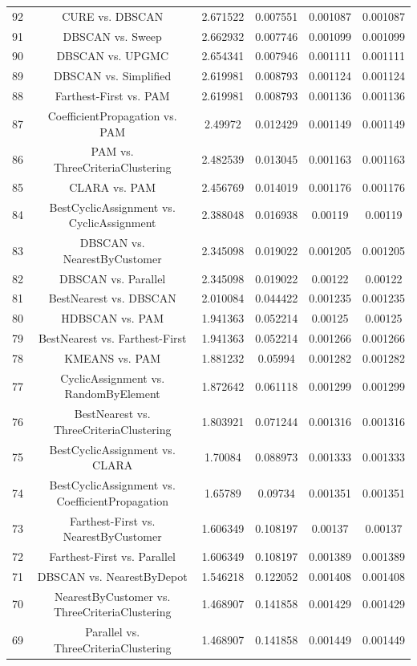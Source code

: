 \documentclass[a4paper,10pt]{article}
\begin{document}
\begin{landscape}
\begin{table}[!htp]
\begin{tabular}{cccccc}
92&CURE vs. DBSCAN&2.671522&0.007551&0.001087&0.001087\\
91&DBSCAN vs. Sweep&2.662932&0.007746&0.001099&0.001099\\
90&DBSCAN vs. UPGMC&2.654341&0.007946&0.001111&0.001111\\
89&DBSCAN vs. Simplified&2.619981&0.008793&0.001124&0.001124\\
88&Farthest-First vs. PAM&2.619981&0.008793&0.001136&0.001136\\
87&CoefficientPropagation vs. PAM&2.49972&0.012429&0.001149&0.001149\\
86&PAM vs. ThreeCriteriaClustering&2.482539&0.013045&0.001163&0.001163\\
85&CLARA vs. PAM&2.456769&0.014019&0.001176&0.001176\\
84&BestCyclicAssignment vs. CyclicAssignment&2.388048&0.016938&0.00119&0.00119\\
83&DBSCAN vs. NearestByCustomer&2.345098&0.019022&0.001205&0.001205\\
82&DBSCAN vs. Parallel&2.345098&0.019022&0.00122&0.00122\\
81&BestNearest vs. DBSCAN&2.010084&0.044422&0.001235&0.001235\\
80&HDBSCAN vs. PAM&1.941363&0.052214&0.00125&0.00125\\
79&BestNearest vs. Farthest-First&1.941363&0.052214&0.001266&0.001266\\
78&KMEANS vs. PAM&1.881232&0.05994&0.001282&0.001282\\
77&CyclicAssignment vs. RandomByElement&1.872642&0.061118&0.001299&0.001299\\
76&BestNearest vs. ThreeCriteriaClustering&1.803921&0.071244&0.001316&0.001316\\
75&BestCyclicAssignment vs. CLARA&1.70084&0.088973&0.001333&0.001333\\
74&BestCyclicAssignment vs. CoefficientPropagation&1.65789&0.09734&0.001351&0.001351\\
73&Farthest-First vs. NearestByCustomer&1.606349&0.108197&0.00137&0.00137\\
72&Farthest-First vs. Parallel&1.606349&0.108197&0.001389&0.001389\\
71&DBSCAN vs. NearestByDepot&1.546218&0.122052&0.001408&0.001408\\
70&NearestByCustomer vs. ThreeCriteriaClustering&1.468907&0.141858&0.001429&0.001429\\
69&Parallel vs. ThreeCriteriaClustering&1.468907&0.141858&0.001449&0.001449\\

\end{tabular}
\end{table}
\end{landscape}
\end{document}
